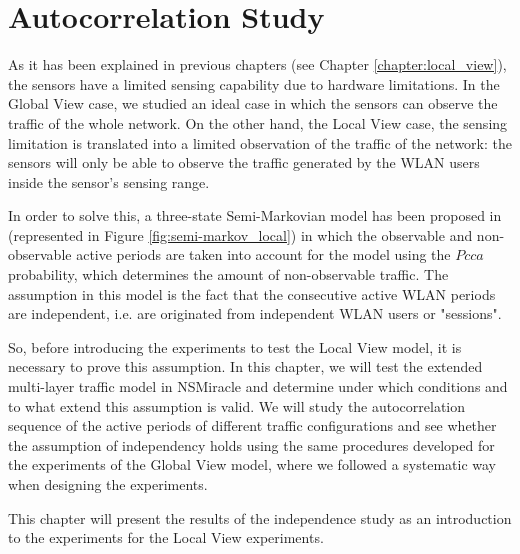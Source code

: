 \chapter{Autocorrelation Study} \label{chapter:autocorrelation_results}
As it has been explained in previous chapters (see Chapter \ref{chapter:local_view}), the sensors have a limited sensing capability due to hardware limitations. In the Global View case, we studied an ideal case in which the sensors can observe the traffic of the whole network. On the other hand, the Local View case, the sensing limitation is translated into a limited observation of the traffic of the network: the sensors will only be able to observe the traffic generated by the \acs{WLAN} users inside the sensor's sensing range.

In order to solve this, a three-state Semi-Markovian model has been proposed in \cite{marcello} (represented in Figure \ref{fig:semi-markov_local}) in which the observable and non-observable active periods are taken into account for the model using the $Pcca$ probability, which determines the amount of non-observable traffic. The assumption in this model is the fact that the consecutive active \acs{WLAN} periods are independent, i.e. are originated from independent \acs{WLAN} users or "sessions". 

So, before introducing the experiments to test the Local View model, it is necessary to prove this assumption. In this chapter, we will test the extended multi-layer traffic model in NSMiracle and determine under which conditions and to what extend this assumption is valid. We will study the autocorrelation sequence of the active periods of different traffic configurations and see whether the assumption of independency holds using the same procedures developed for the experiments of the Global View model, where we followed a systematic way when designing the experiments.

This chapter will present the results of the independence study as an introduction to the experiments for the Local View experiments.